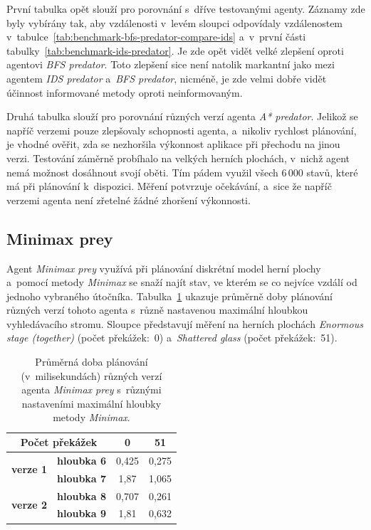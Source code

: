 První tabulka opět slouží pro porovnání s~dříve testovanými agenty. Záznamy zde byly vybírány tak, aby vzdálenosti v~levém sloupci odpovídaly vzdálenostem v~tabulce~\ref{tab:benchmark-bfs-predator-compare-ids} a~v~první části tabulky~\ref{tab:benchmark-ids-predator}. Je zde opět vidět velké zlepšení oproti agentovi \emph{BFS predator}. Toto zlepšení sice není natolik markantní jako mezi agentem \emph{IDS predator} a~\emph{BFS predator}, nicméně, je zde velmi dobře vidět účinnost informované metody oproti neinformovaným.

Druhá tabulka slouží pro porovnání různých verzí agenta \emph{A* predator}. Jelikož se napříč verzemi pouze zlepšovaly schopnosti agenta, a~nikoliv rychlost plánování, je vhodné ověřit, zda se nezhoršila výkonnost aplikace při přechodu na jinou verzi. Testování záměrně probíhalo na velkých herních plochách, v~nichž agent nemá možnost dosáhnout svojí oběti. Tím pádem využil všech 6\,000 stavů, které má při plánování k~dispozici. Měření potvrzuje očekávání, a~sice že napříč verzemi agenta není zřetelné žádné zhoršení výkonnosti.

\subsection*{Minimax prey}

Agent \emph{Minimax prey} využívá při plánování diskrétní model herní plochy a~pomocí metody \emph{Minimax} se snaží najít stav, ve kterém se co nejvíce vzdálí od jednoho vybraného útočníka. Tabulka~\ref{tab:benchmark-minimax-prey-versions} ukazuje průměrně doby plánování různých verzí tohoto agenta s~různě nastavenou maximální hloubkou vyhledávacího stromu. Sloupce představují měření na herních plochách \emph{Enormous stage (together)} (počet překážek:~0) a~\emph{Shattered glass} (počet překážek:~51).

\begin{table}[ht]
    \centering
    \begin{tabular}{|c|c|c|c|} \hline
        \multicolumn{2}{|c|}{\textbf{Počet překážek}} & \textbf{0} & \textbf{51} \\ \hline\hline
        \multirow{2}{*}{\textbf{verze 1}} & \textbf{hloubka 6} & 0,425 & 0,275 \\ \cline{2-4}
                                          & \textbf{hloubka 7} & 1,87  & 1,065 \\ \hline
        \multirow{2}{*}{\textbf{verze 2}} & \textbf{hloubka 8} & 0,707 & 0,261 \\ \cline{2-4}
                                          & \textbf{hloubka 9} & 1,81  & 0,632 \\ \hline
    \end{tabular}
    \caption{Průměrná doba plánování (v~milisekundách) různých verzí agenta \emph{Minimax prey} s~různými nastaveními maximální hloubky metody \emph{Minimax}.}
    \label{tab:benchmark-minimax-prey-versions}
\end{table}

